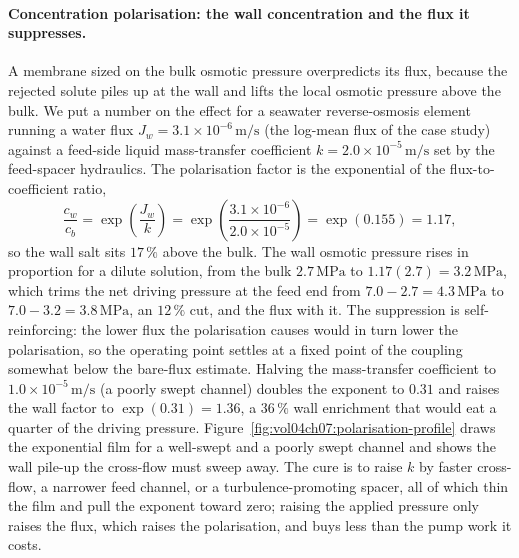 \paragraph{Concentration polarisation: the wall concentration and the flux it
suppresses.} A membrane sized on the bulk osmotic pressure overpredicts its
flux, because the rejected solute piles up at the wall and lifts the local
osmotic pressure above the bulk. We put a number on the effect for a seawater
reverse-osmosis element running a water flux $J_w = 3.1\times 10^{-6}\,
\text{m/s}$ (the log-mean flux of the case study) against a feed-side liquid
mass-transfer coefficient $k = 2.0\times 10^{-5}\,\text{m/s}$ set by the
feed-spacer hydraulics. The polarisation factor is the exponential of the
flux-to-coefficient ratio,
\[
\frac{c_w}{c_b} = \exp\!\left(\frac{J_w}{k}\right) = \exp\!\left(\frac{3.1
\times 10^{-6}}{2.0\times 10^{-5}}\right) = \exp(0.155) = 1.17,
\]
so the wall salt sits $17\,\%$ above the bulk. The wall osmotic pressure rises
in proportion for a dilute solution, from the bulk $2.7\,\text{MPa}$ to
$1.17(2.7) = 3.2\,\text{MPa}$, which trims the net driving pressure at the
feed end from $7.0 - 2.7 = 4.3\,\text{MPa}$ to $7.0 - 3.2 = 3.8\,\text{MPa}$,
an $12\,\%$ cut, and the flux with it. The suppression is self-reinforcing:
the lower flux the polarisation causes would in turn lower the polarisation,
so the operating point settles at a fixed point of the coupling somewhat below
the bare-flux estimate. Halving the mass-transfer coefficient to $1.0\times
10^{-5}\,\text{m/s}$ (a poorly swept channel) doubles the exponent to $0.31$
and raises the wall factor to $\exp(0.31) = 1.36$, a $36\,\%$ wall
enrichment that would eat a quarter of the driving pressure.
Figure~\ref{fig:vol04ch07:polarisation-profile} draws the exponential film for
a well-swept and a poorly swept channel and shows the wall pile-up the
cross-flow must sweep away. The cure is to raise $k$ by faster cross-flow, a
narrower feed channel, or a turbulence-promoting spacer, all of which thin the
film and pull the exponent toward zero; raising the applied pressure only
raises the flux, which raises the polarisation, and buys less than the pump
work it costs.



